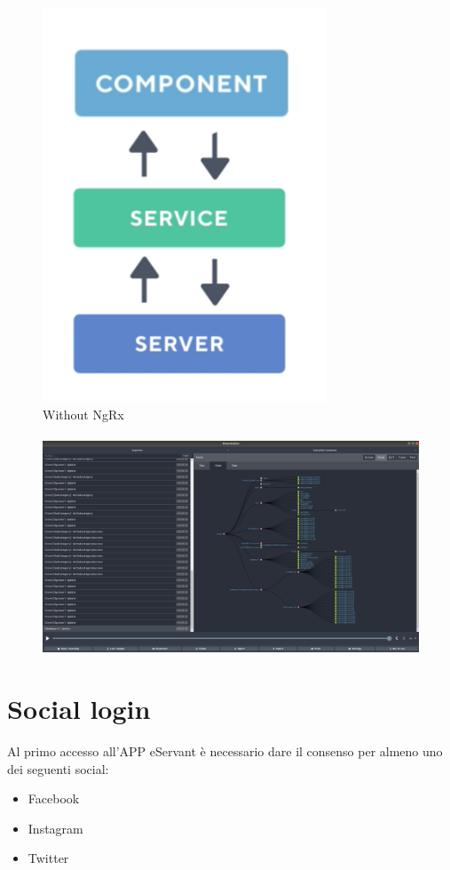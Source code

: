 \begin{figure}[h!]
    \centering  
    \caption{Without NgRx}
    \includegraphics[scale=0.5]{img/cap2/without-ngrx}
\end{figure}
\paragraph{}

\begin{figure}[h!]
    \centering  
    \includegraphics[scale=0.2]{img/cap2/ngrx-eservant}
\end{figure}

\section{Social login}
Al primo accesso all'APP eServant è necessario dare il consenso per almeno uno dei seguenti social:
\begin{itemize}
\item Facebook
\item Instagram
\item Twitter
\end{itemize}

